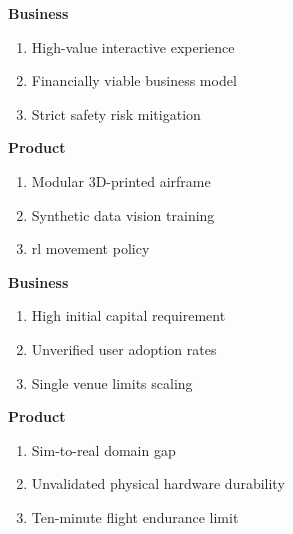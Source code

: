 \documentclass{report_template_oxford}
\begin{document}
\begin{figure}[htbp]
\centering
\begin{minipage}{\textwidth}
\begin{tcbraster}[raster columns=2, raster row skip=1mm, boxrule=0mm, arc=0mm]
\begin{tcolorbox}[equal height group=A, size=fbox, colback=swotS!60, colframe=swotS!80!black, title=\textsc{Strengths}]
\textbf{Business} \vspace{-1em}
\begin{enumerate}
\setlength{\itemsep}{3pt}
\setlength{\parskip}{0pt}
\item High-value interactive experience
\item Financially viable business model
\item Strict safety risk mitigation
\end{enumerate}
\tcblower
\textbf{Product} \vspace{-1em}
\begin{enumerate}
\setlength{\itemsep}{3pt}
\setlength{\parskip}{0pt}
\item Modular 3D-printed airframe
\item Synthetic data vision training
\item \gls{rl} movement policy
\end{enumerate}
\end{tcolorbox}
\begin{tcolorbox}[equal height group=A, size=fbox, colback=swotW!60, colframe=swotW!80!black, title=\textsc{Weaknesses}]
\textbf{Business} \vspace{-1em}
\begin{enumerate}
\setlength{\itemsep}{3pt}
\setlength{\parskip}{0pt}
\item High initial capital requirement
\item Unverified user adoption rates
\item Single venue limits scaling
\end{enumerate}
\tcblower
\textbf{Product} \vspace{-1em}
\begin{enumerate}
\setlength{\itemsep}{3pt}
\setlength{\parskip}{0pt}
\item Sim-to-real domain gap
\item Unvalidated physical hardware durability
\item Ten-minute flight endurance limit
\end{enumerate}
\end{tcolorbox}
\begin{tcolorbox}[equal height group=B, size=fbox, colback=swotO!60, colframe=swotO!80!black, title=\textsc{Opportunities}]

\end{tcolorbox}
\end{tcbraster}
\end{minipage}
\end{figure}
\end{document}
